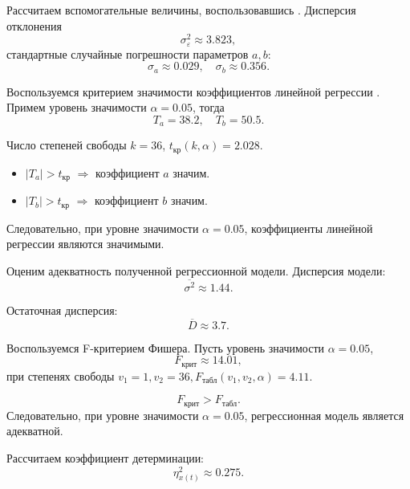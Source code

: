 Рассчитаем вспомогательные величины, воспользовавшись \cite{Eddows1997}. Дисперсия отклонения
\begin{equation*}
	\sigma_{\varepsilon}^2 \approx 3.823,
\end{equation*}
стандартные случайные погрешности параметров $a, b$:
\begin{equation*}
	\sigma_{a} \approx 0.029, \quad \sigma_{b} \approx 0.356.
\end{equation*}

Воспользуемся критерием значимости коэффициентов линейной регрессии \cite{Eliseeva1995}. Примем уровень значимости $\alpha = 0.05$, тогда
\begin{equation*}
	T_{a} = 38.2, \quad T_{b} = 50.5.
\end{equation*}

Число степеней свободы $k = 36$, $t_{\textrm{кр}}(k, \alpha) = 2.028$.

\begin{itemize}
	\item $\vert T_{a} \vert > t_{\textrm{кр}}$ $\Rightarrow$ коэффициент $a$ значим.
	\item $\vert T_{b} \vert > t_{\textrm{кр}}$ $\Rightarrow$ коэффициент $b$ значим.
\end{itemize}
Следовательно, при уровне значимости $\alpha = 0.05$, коэффициенты линейной регрессии являются значимыми.

Оценим адекватность полученной регрессионной модели. Дисперсия модели:
\begin{equation*}
	\overline{\sigma^2} \approx 1.44.
\end{equation*}

Остаточная дисперсия:
\begin{equation*}
	\overline{D} \approx 3.7.
\end{equation*}

Воспользуемся F-критерием Фишера. Пусть уровень значимости $\alpha = 0.05$,
\begin{equation*}
	F_{\textrm{крит}} \approx 14.01,
\end{equation*}
при степенях свободы $v_1 = 1, v_2 = 36, F_{\textrm{табл}}(v_1, v_2, \alpha) = 4.11$.

\begin{equation*}
	F_{\textrm{крит}} > F_{\textrm{табл}}.
\end{equation*}
Следовательно, при уровне значимости $\alpha = 0.05$, регрессионная модель является адекватной.

Рассчитаем коэффициент детерминации:
\begin{equation*}
	\eta_{x(t)}^2 \approx 0.275.
\end{equation*}

